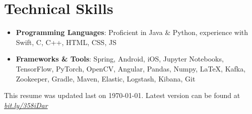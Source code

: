 \documentclass[letterpaper,11pt]{article}
\newcommand{\resumeSubHeadingListStart}{\begin{itemize}[leftmargin=*]}
\newcommand{\resumeSubHeadingListEnd}{\end{itemize}}
\begin{document}
	
	\section{Technical Skills}
	\resumeSubHeadingListStart
	\item{
		\textbf{Programming Languages}{: Proficient in Java \& Python, experience with Swift, C, C++, HTML, CSS, JS}}
	\vspace{-8pt}
	\item{
		\textbf{Frameworks \& Tools}{: Spring, Android, iOS, Jupyter Notebooks, TensorFlow, PyTorch, OpenCV, Angular, Pandas, Numpy, \LaTeX, Kafka, Zookeeper, Gradle, Maven, Elastic, Logstash, Kibana, Git}}
	\resumeSubHeadingListEnd
	
	\begin{center}
		\small This resume was updated last on \today. Latest version can be found at \href{http://bit.ly/358iDar}{\textit{bit.ly/358iDar}}
	\end{center}
	
	
\end{document}
